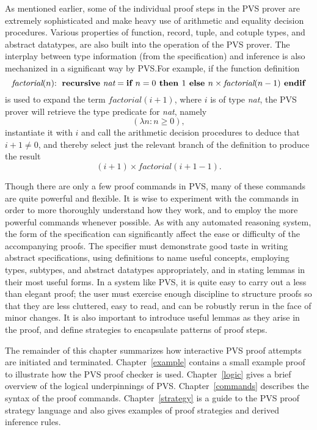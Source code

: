 \documentclass[12pt]{book}
\begin{document}
As mentioned earlier, some of the individual proof steps in the PVS prover
are extremely sophisticated and make heavy use of arithmetic and equality
decision procedures.  Various properties of function, record, tuple, and
cotuple types, and abstract datatypes, are also built into the operation
of the PVS prover.  The interplay between type information (from the
specification) and inference is also mechanized in a significant way by
PVS.\@ For example, if the function definition \[\textit{factorial}(n)
{\bf :\ recursive\ } \textit{nat} = \mbox{\bf if\ } n=0 \mbox{\bf \ then } 1 \mbox{\bf \ else } n\times
\textit{factorial}(n-1) \mbox{\bf \ endif}\] is used to expand the term
$\textit{factorial}(i+1)$, where $i$ is of type \emph{nat}, the PVS prover
will retrieve the type predicate for \emph{nat}, namely \[(\lambda n: n
\geq 0),\] instantiate it with $i$ and call the arithmetic decision
procedures to deduce that $i+1 \neq 0$, and thereby select just the
relevant branch of the definition to produce the result \[ (i+1)\times
\textit{factorial}(i+1-1). \]

Though there are only a few proof commands in PVS, many of these commands
are quite powerful and flexible.  It is wise to experiment with the
commands in order to more thoroughly understand how they work, and to
employ the more powerful commands whenever possible.  As with any
automated reasoning system, the form of the specification can
significantly affect the ease or difficulty of the accompanying proofs.
The specifier must demonstrate good taste in writing abstract
specifications, using definitions to name useful concepts, employing
types, subtypes, and abstract datatypes appropriately, and in stating
lemmas in their most useful forms.  In a system like PVS, it is quite easy
to carry out a less than elegant proof; the user must exercise enough
discipline to structure proofs so that they are less cluttered, easy to
read, and can be robustly rerun in the face of minor changes.  It is also
important to introduce useful lemmas as they arise in the proof, and
define strategies to encapsulate patterns of proof steps.

The remainder of this chapter summarizes how interactive PVS proof
attempts are initiated and terminated.  Chapter~\ref{example} contains a
small example proof to illustrate how the PVS proof checker is used.
Chapter~\ref{logic} gives a brief overview of the logical underpinnings of
PVS\@.  Chapter~\ref{commands} describes the syntax of the proof commands.
Chapter~\ref{strategy} is a guide to the PVS proof strategy language and
also gives examples of proof strategies and derived inference rules.
\end{document}
